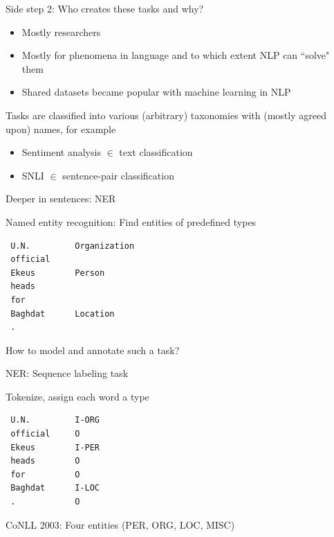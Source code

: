 \documentclass[12pt,aspectratio=169,handout]{beamer}
\begin{document}
\begin{frame}{ Side step 2: Who creates these tasks and why?}

\begin{itemize}
	\item Mostly researchers
	\item Mostly for phenomena in language and to which extent NLP can ``solve" them
	\item Shared datasets became popular with machine learning in NLP
\end{itemize}

Tasks are classified into various (arbitrary) taxonomies with (mostly agreed upon) names, for example

\begin{itemize}
	\item Sentiment analysis $\in$ text classification
	\item SNLI $\in$ sentence-pair classification
\end{itemize}


\end{frame}

\begin{frame}[fragile]{ Deeper in sentences: NER}

Named entity recognition: Find entities of predefined types

\begin{example}
\begin{verbatim}
 U.N.         Organization
 official     
 Ekeus        Person
 heads        
 for          
 Baghdat      Location
 .            
\end{verbatim}
\end{example}

How to model and annotate such a task?


\end{frame}

\begin{frame}[fragile]{NER: Sequence labeling task}

Tokenize, assign each word a type

\begin{example}
\begin{verbatim}
 U.N.         I-ORG
 official     O
 Ekeus        I-PER
 heads        O
 for          O
 Baghdat      I-LOC
 .            O
\end{verbatim}
\end{example}

CoNLL 2003: Four entities (PER, ORG, LOC, MISC)

\end{frame}
\end{document}

